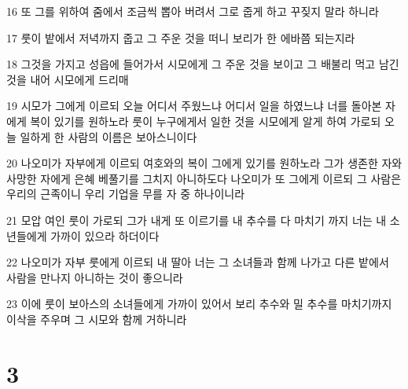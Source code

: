 \par 16 또 그를 위하여 줌에서 조금씩 뽑아 버려서 그로 줍게 하고 꾸짖지 말라 하니라
\par 17 룻이 밭에서 저녁까지 줍고 그 주운 것을 떠니 보리가 한 에바쯤 되는지라
\par 18 그것을 가지고 성읍에 들어가서 시모에게 그 주운 것을 보이고 그 배불리 먹고 남긴 것을 내어 시모에게 드리매
\par 19 시모가 그에게 이르되 오늘 어디서 주웠느냐 어디서 일을 하였느냐 너를 돌아본 자에게 복이 있기를 원하노라 룻이 누구에게서 일한 것을 시모에게 알게 하여 가로되 오늘 일하게 한 사람의 이름은 보아스니이다
\par 20 나오미가 자부에게 이르되 여호와의 복이 그에게 있기를 원하노라 그가 생존한 자와 사망한 자에게 은혜 베풀기를 그치지 아니하도다 나오미가 또 그에게 이르되 그 사람은 우리의 근족이니 우리 기업을 무를 자 중 하나이니라
\par 21 모압 여인 룻이 가로되 그가 내게 또 이르기를 내 추수를 다 마치기 까지 너는 내 소년들에게 가까이 있으라 하더이다
\par 22 나오미가 자부 룻에게 이르되 내 딸아 너는 그 소녀들과 함께 나가고 다른 밭에서 사람을 만나지 아니하는 것이 좋으니라
\par 23 이에 룻이 보아스의 소녀들에게 가까이 있어서 보리 추수와 밀 추수를 마치기까지 이삭을 주우며 그 시모와 함께 거하니라

\chapter{3}

